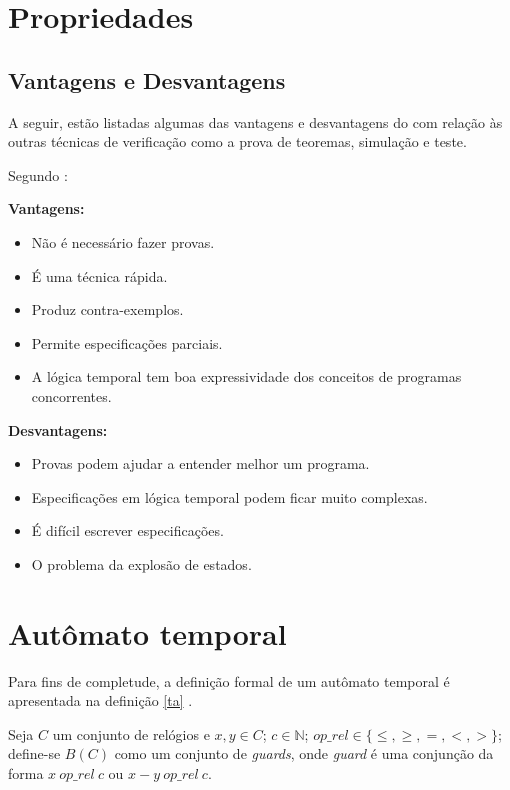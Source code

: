 \documentclass{utfpr-pg}
\begin{document}
\section{Propriedades}
\lipsum[55]

\subsection{Vantagens e Desvantagens}
A seguir, estão listadas algumas das vantagens e desvantagens do com relação às outras técnicas de verificação como a prova de teoremas, simulação e teste.

Segundo :

\noindent
\begin{minipage}[t]{0.49\columnwidth}%
\noindent \textbf{Vantagens:}
\begin{itemize}
\item Não é necessário fazer provas.
\item É uma técnica rápida.
\item Produz contra-exemplos.
\item Permite especificações parciais.
\item A lógica temporal tem boa expressividade dos conceitos de programas concorrentes.
\end{itemize}
\end{minipage}%
\begin{minipage}[t]{0.49\columnwidth}%
\textbf{Desvantagens:}
\begin{itemize}
\item Provas podem ajudar a entender melhor um programa.
\item Especificações em lógica temporal podem ficar muito complexas.
\item É difícil escrever especificações.
\item O problema da explosão de estados.
\end{itemize}
\end{minipage}

\section{Autômato temporal}
Para fins de completude, a definição formal de um autômato temporal é apresentada na definição \ref{ta} \cite{secret}.

\begin{definicao}
  \captionsetup{justification=raggedright,
singlelinecheck=false
}
  \caption{Autômato temporal}
  \label{ta}
  Seja $\mathit{C}$ um conjunto de relógios e $\mathit{x},\mathit{y} \in C$; $\mathit{c}\in\mathbb{N}$; $op\_rel \in \{\leq,\geq,=,<,>\}$; define-se $B(C)$ como um conjunto de \textit{guards}, onde \textit{guard} é uma conjunção da forma $\mathit{x}\ op\_rel\ \mathit{c}$ ou $\mathit{x}-\mathit{y}\ op\_rel\ \mathit{c}$.    
\end{definicao}
\end{document}
